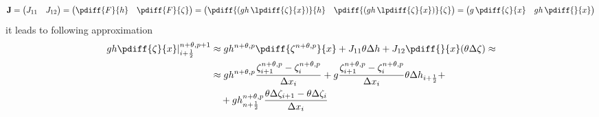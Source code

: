 \begin{align}
    \mat{J} =
    \begin{pmatrix}
        J_{11} & J_{12}
    \end{pmatrix}
    =
    \begin{pmatrix}
        \pdiff{F}{h} & \pdiff{F}{\zeta}
    \end{pmatrix}
    =
    \begin{pmatrix}
        \pdiff{(gh\, \lpdiff{\zeta}{x})}{h} & \pdiff{(gh\, \lpdiff{\zeta}{x})}{\zeta}
    \end{pmatrix}
    =
    \begin{pmatrix}
        g\, \pdiff{\zeta}{x} & gh\, \pdiff{}{x}
    \end{pmatrix}
\end{align}
it leads to following approximation
\begin{align}
    \left.gh \pdiff{\zeta}{x}\right|^{n+\theta, p+1}_{i+\half} & \approx g h^{n+\theta, p} \pdiff{\zeta^{n+\theta, p}}{x}
    + J_{11} \theta \Delta h
    + J_{12} \pdiff{}{x}(\theta \Delta \zeta) \approx
    \\
    & \approx g h^{n+\theta, p} \frac{\zeta^{n+\theta, p}_{i+1} - \zeta^{n+\theta, p}_{i}}{\Dx_{i}}
    + g \frac{\zeta^{n+\theta, p}_{i+1} - \zeta^{n+\theta, p}_{i}}{\Dx_{i}} \theta\Delta h_{i+\half} +
    \\
    & \quad + gh^{n+\theta, p}_{n+\half} \frac{\theta\Delta \zeta_{i+1} - \theta\Delta \zeta_{i}}{\Dx_{i}}
\end{align}
